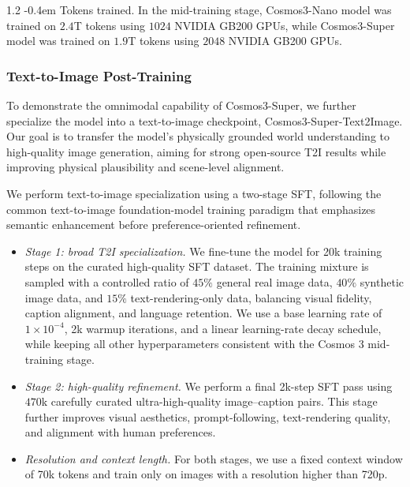 \documentclass{llmxive}
\makeatletter
\providecommand{\paragraph}{  \@startsection{paragraph}{4}{\z@}    {1\baselineskip \@plus .2\baselineskip}    {-0.4em}    {\normalfont\normalsize\bfseries}}
\makeatother
\begin{document}
\paragraph{Tokens trained.} In the mid-training stage, Cosmos3-Nano model was trained on $2.4$T tokens using $1024$ NVIDIA GB200 GPUs, while Cosmos3-Super model was trained on $1.9$T tokens using $2048$ NVIDIA GB200 GPUs.


\subsubsection{Text-to-Image Post-Training}
\label{sec::t2i_post_train}

To demonstrate the omnimodal capability of Cosmos3-Super, we further specialize the model into a text-to-image checkpoint, Cosmos3-Super-Text2Image. Our goal is to transfer the model's physically grounded world understanding to high-quality image generation, aiming for strong open-source T2I results while improving physical plausibility and scene-level alignment.

We perform text-to-image specialization using a two-stage SFT, following the common text-to-image foundation-model training paradigm that emphasizes semantic enhancement before preference-oriented refinement.

\begin{itemize}
\item \textit{Stage 1: broad T2I specialization.} We fine-tune the model for 20k training steps on the curated high-quality SFT dataset. The training mixture is sampled with a controlled ratio of $45\%$ general real image data, $40\%$ synthetic image data, and $15\%$ text-rendering-only data, balancing visual fidelity, caption alignment, and language retention. We use a base learning rate of $1\times10^{-4}$, 2k warmup iterations, and a linear learning-rate decay schedule, while keeping all other hyperparameters consistent with the Cosmos 3 mid-training stage.

\item \textit{Stage 2: high-quality refinement.} We perform a final 2k-step SFT pass using $470$k carefully curated ultra-high-quality image--caption pairs. This stage further improves visual aesthetics, prompt-following, text-rendering quality, and alignment with human preferences.

\item \textit{Resolution and context length.} For both stages, we use a fixed context window of 70k tokens and train only on images with a resolution higher than 720p.
\end{itemize}
\end{document}

